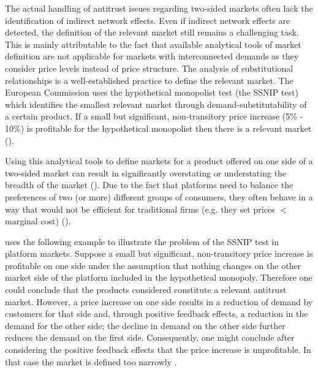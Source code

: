 \documentclass[12pt,a4paper,notitlepage]{article}
\begin{document}
The actual handling of antitrust issues regarding two-sided markets often lack the identification of indirect network effects. Even if indirect network effects are detected, the definition of the relevant market still remains a challenging task. This is mainly attributable to the fact that available analytical tools of market definition are not applicable for markets with interconnected demands as they consider price levels instead of price structure. The analysis of substitutional relationships is a well-established practice to define the relevant market. The European Commission uses the hypothetical monopolist test (the SSNIP test) which identifies the smallest relevant market through demand-substitutability of a certain product. If a small but significant, non-transitory price increase (5\% - 10\%) is profitable for the hypothetical monopolist then there is a relevant market (\cite{motta_competition_2004}). 

Using this analytical tools to define markets for a product offered on one side of a two-sided market can result in significantly overstating or understating the breadth of the market (\cite{evans_analysis_2008}). Due to the fact that platforms need to balance the preferences of two (or more) different groups of consumers, they often behave in a way that would not be efficient for traditional firms (e.g. they set prices $<$ marginal cost) (\cite{chandra_mergers_2009}).

\cite{evans_market_2012} uses the following example to illustrate the problem of the SSNIP test in platform markets. Suppose a small but significant, non-transitory price increase is profitable on one side under the assumption that nothing changes on the other market side of the platform included in the hypothetical monopoly. Therefore one could conclude that the products considered constitute a relevant antitrust market. However, a price increase on one side results in a reduction of demand by customers for that side and, through positive feedback effects, a reduction in the demand for the other side; the decline in demand on the other side further reduces the demand on the first side. Consequently, one might conclude after considering the positive feedback effects that the price increase is unprofitable. In that case the market is defined too narrowly .
\end{document}
